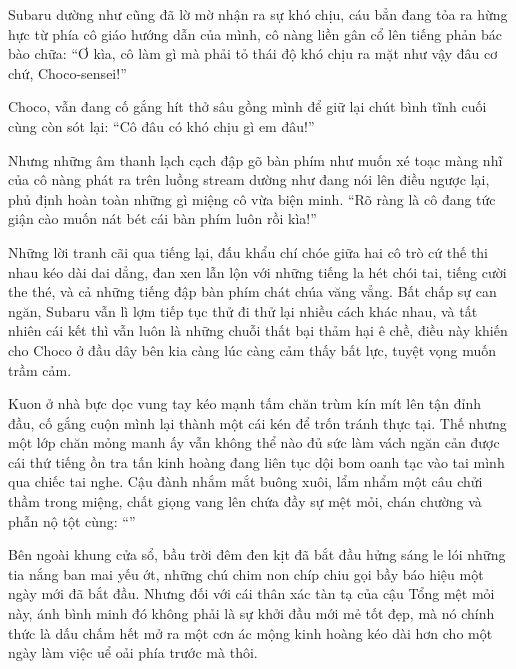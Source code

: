 \documentclass[../main.tex]{subfiles}
\begin{document}
\il

Subaru dường như cũng đã lờ mờ nhận ra sự khó chịu, cáu bẳn đang tỏa ra hừng hực từ phía cô giáo hướng dẫn của mình, cô nàng liền gân cổ lên tiếng phản bác bào chữa: ``Ơ kìa, cô làm gì mà phải tỏ thái độ khó chịu ra mặt như vậy đâu cơ chứ, Choco-sensei!''

Choco, vẫn đang cố gắng hít thở sâu gồng mình để giữ lại chút bình tĩnh cuối cùng còn sót lại: ``Cô đâu có khó chịu gì em đâu!''

Nhưng những âm thanh lạch cạch đập gõ bàn phím như muốn xé toạc màng nhĩ của cô nàng phát ra trên luồng stream dường như đang nói lên điều ngược lại, phủ định hoàn toàn những gì miệng cô vừa biện minh. ``Rõ ràng là cô đang tức giận cào muốn nát bét cái bàn phím luôn rồi kìa!''

Những lời tranh cãi qua tiếng lại, đấu khẩu chí chóe giữa hai cô trò cứ thế thi nhau kéo dài dai dẳng, đan xen lẫn lộn với những tiếng la hét chói tai, tiếng cười the thé, và cả những tiếng đập bàn phím chát chúa văng vẳng. Bất chấp sự can ngăn, Subaru vẫn lì lợm tiếp tục thử đi thử lại nhiều cách khác nhau, và tất nhiên cái kết thì vẫn luôn là những chuỗi thất bại thảm hại ê chề, điều này khiến cho Choco ở đầu dây bên kia càng lúc càng cảm thấy bất lực, tuyệt vọng muốn trầm cảm.

\il

Kuon ở nhà bực dọc vung tay kéo mạnh tấm chăn trùm kín mít lên tận đỉnh đầu, cố gắng cuộn mình lại thành một cái kén để trốn tránh thực tại. Thế nhưng một lớp chăn mỏng manh ấy vẫn không thể nào đủ sức làm vách ngăn cản được cái thứ tiếng ồn tra tấn kinh hoàng đang liên tục dội bom oanh tạc vào tai mình qua chiếc tai nghe. Cậu đành nhắm mắt buông xuôi, lẩm nhẩm một câu chửi thầm trong miệng, chất giọng vang lên chứa đầy sự mệt mỏi, chán chường và phẫn nộ tột cùng: ``\textit{}''

Bên ngoài khung cửa sổ, bầu trời đêm đen kịt đã bắt đầu hửng sáng le lói những tia nắng ban mai yếu ớt, những chú chim non chíp chiu gọi bầy báo hiệu một ngày mới đã bắt đầu. Nhưng đối với cái thân xác tàn tạ của cậu Tổng mệt mỏi này, ánh bình minh đó không phải là sự khởi đầu mới mẻ tốt đẹp, mà nó chính thức là dấu chấm hết mở ra một cơn ác mộng kinh hoàng kéo dài hơn cho một ngày làm việc uể oải phía trước mà thôi.
\end{document}
